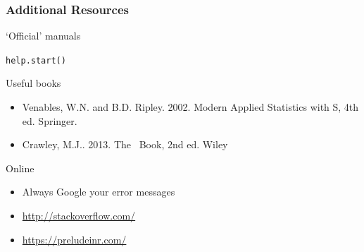 \documentclass[color=usenames,dvipsnames]{beamer}\usepackage[]{graphicx}\usepackage[]{color}
\makeatletter
\newcommand{\hlstd}[1]{\textcolor[rgb]{0,0,0}{#1}}%
\newcommand{\hlkwd}[1]{\textcolor[rgb]{0.004,0.004,0.506}{#1}}%
\newenvironment{kframe}{%
 \def\at@end@of@kframe{}%
 \ifinner\ifhmode%
  \def\at@end@of@kframe{\end{minipage}}%
  \begin{minipage}{\columnwidth}%
 \fi\fi%
 \def\FrameCommand##1{\hskip\@totalleftmargin \hskip-\fboxsep
 \colorbox{shadecolor}{##1}\hskip-\fboxsep
     \hskip-\linewidth \hskip-\@totalleftmargin \hskip\columnwidth}%
 \MakeFramed {\advance\hsize-\width
   \@totalleftmargin\z@ \linewidth\hsize
   \@setminipage}}%
 {\par\unskip\endMakeFramed%
 \at@end@of@kframe}
\newenvironment{knitrout}{}{} %
\makeatother
\begin{document}
\begin{frame}[fragile]
  \frametitle{Additional Resources}
  \Large
  `Official' manuals
\begin{knitrout}
\color{fgcolor}\begin{kframe}
\begin{alltt}
\hlkwd{help.start}\hlstd{()}
\end{alltt}
\end{kframe}
\end{knitrout}
Useful books
\begin{itemize}
  \large
\item Venables, W.N. and B.D. Ripley. 2002. Modern Applied Statistics with
  S, 4th ed. Springer.
\item Crawley, M.J.. 2013. The \R~Book, 2nd ed. Wiley
\end{itemize}
Online
    \begin{itemize}
      \large
      \item Always Google your error messages
      \item \url{http://stackoverflow.com/}
      \item \url{https://preludeinr.com/}
    \end{itemize}
\end{frame}
\end{document}
